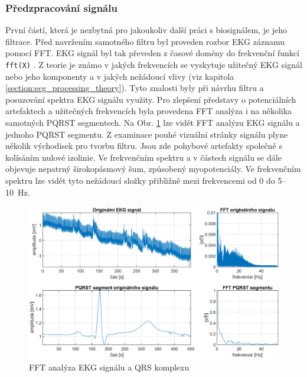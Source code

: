 \subsubsection{Předzpracování signálu}
\label{section:preprocessing}
První částí, která je nezbytná pro jakoukoliv další práci s biosignálem, je jeho
filtrace. Před navržením samotného filtru byl proveden rozbor EKG záznamu pomocí
FFT. EKG signál byl tak převeden z časové domény do frekvenční funkcí
\texttt{fft(X)} \cite{matlabFFT}. Z teorie je známo v jakých frekvencích se
vyskytuje užitečný EKG signál nebo jeho komponenty a v jakých nežádoucí vlivy
(viz kapitola \ref{section:ecg_processing_theory}). Tyto znalosti byly při
návrhu filtru a posuzování spektra EKG signálu využity. Pro zlepšení představy o
potenciálních artefaktech a užitečných frekvencích byla provedena FFT analýza i
na několika samotných PQRST segmentech. Na Obr. \ref{fig:spectral_analysis} lze
vidět FFT analýzu EKG signálu a jednoho PQRST segmentu. Z examinace pouhé
vizuální stránky signálu plyne několik východisek pro tvorbu filtru. Jsou zde
pohybové artefakty společně s kolísáním nulové izolinie. Ve frekvenčním spektru
a v částech signálu se dále objevuje nepatrný širokopásmový šum, způsobený
myopotenciály. Ve frekvenčním spektru lze vidět tyto nežádoucí složky přibližně
mezi frekvencemi od 0 do 5--10~\si\Hz.

\begin{figure}[h]
    \begin{center}
        \includegraphics[width=1\textwidth]{../assets/figures/spectral_analysis}
        \caption{FFT analýza EKG signálu a QRS komplexu}
        \label{fig:spectral_analysis}
    \end{center}
\end{figure}

